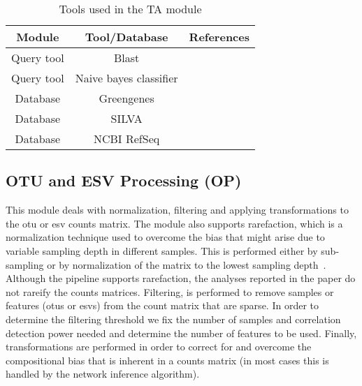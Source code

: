   \begin{table}[h]
    \centering
    \small
    \begin{tabular}{|c|c|c|}
      \hline
      \textbf{Module} & \textbf{Tool/Database} & \textbf{References} \\
      \hline
      Query tool & Blast & \cite{camachoBLASTArchitectureApplications2009} \\
      Query tool & Naive bayes classifier & \cite{bokulichOptimizingTaxonomicClassification2018} \\
      \hline
      Database & Greengenes & \cite{DeSantis2006} \\
      Database & SILVA & \cite{Quast2012} \\
      Database & NCBI RefSeq & \cite{Sayers2009} \\
    \end{tabular}
    \caption{Tools used in the TA module}
    \label{tab:ta_tools}
  \end{table}

  \subsection*{OTU and ESV Processing (OP)}
  \vspace{-5mm}
  This module deals with normalization, filtering and applying transformations to the \ac{otu} or \ac{esv} counts matrix.
  The module also supports rarefaction, which is a normalization technique used to overcome the bias that might arise due to variable sampling depth in different samples.
  This is performed either by sub-sampling or by normalization of the matrix to the lowest sampling depth~\cite{Weiss2015}.
  Although the pipeline supports rarefaction, the analyses reported in the paper do not rareify the counts matrices.
  Filtering, is performed to remove samples or features (\ac{otu}s or \ac{esv}s) from the count matrix that are sparse.
  In order to determine the filtering threshold we fix the number of samples and correlation detection power needed and determine the number of features to be used.
  Finally, transformations are performed in order to correct for and overcome the compositional bias that is inherent in a counts matrix (in most cases this is handled by the network inference algorithm).


